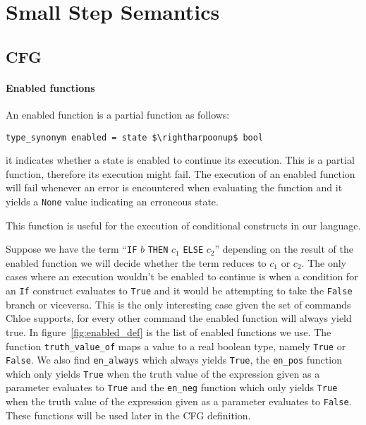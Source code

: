 \section{Small Step Semantics}\label{section:small_step}

\subsection{CFG}\label{subsection:cfg}

\paragraph{Enabled functions}\label{paragraph:enabled}

An enabled function is a partial function as follows:

\begin{lstlisting}[mathescape=true, frame=single]
type_synonym enabled = state $\rightharpoonup$ bool
\end{lstlisting}

it indicates whether a state is enabled to continue its execution.
This is a partial function, therefore its execution might fail.
The execution of an enabled function will fail whenever an error is encountered when evaluating the function and it yields a \verb|None| value indicating an erroneous state.

This function is useful for the execution of conditional constructs in our language.

Suppose we have the term ``\verb|IF| $b$ \verb|THEN| $c_{1}$ \verb|ELSE| $c_{2}$'' depending on the result of the enabled function we will decide whether the term reduces to $c_{1}$ or $c_{2}$.
The only cases where an execution wouldn't be enabled to continue is when a condition for an \verb|If| construct evaluates to \verb|True| and it would be attempting to take the \verb|False| branch or viceversa.
This is the only interesting case given the set of commands Chloe supports, for every other command the enabled function will always yield true.
In figure~\ref{fig:enabled_def} is the list of enabled functions we use.
The function \verb|truth_value_of| maps a value to a real boolean type, namely \verb|True| or \verb|False|.
We also find \verb|en_always| which always yields \verb|True|, the \verb|en_pos| function which only yields \verb|True| when the truth value of the expression given as a parameter evaluates to \verb|True| and the \verb|en_neg| function which only yields \verb|True| when the truth value of the expression given as a parameter evaluates to \verb|False|.
These functions will be used later in the CFG definition.

